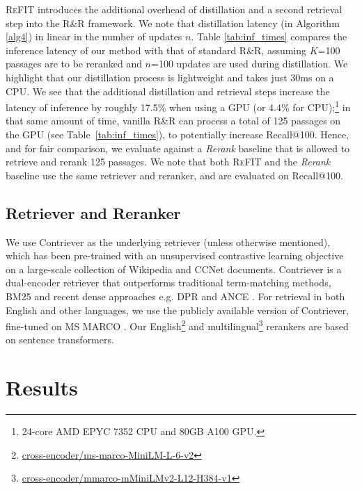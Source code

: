 \textsc{ReFIT} introduces the additional overhead of distillation and a second retrieval step into the R\&R framework. We note that distillation latency (in Algorithm \ref{alg4}) in linear in the number of updates $n$.
Table \ref{tab:inf_times} compares the inference latency of our method with that of standard R\&R, assuming $K$=100 passages are to be reranked and $n$=100 updates are used during distillation. We highlight that our distillation process is lightweight and takes just 30ms on a CPU. We see that the additional distillation and retrieval steps increase the latency of inference by roughly 17.5\% when using a GPU (or 4.4\% for CPU);\footnote{24-core AMD EPYC 7352 CPU and 80GB A100 GPU.} in that same amount of time, vanilla R\&R can process a total of 125 passages on the GPU (see Table~\ref{tab:inf_times}), to potentially increase Recall@100. Hence, and for fair comparison, we evaluate against a \mbox{\textit{Rerank}} baseline that is allowed to retrieve and rerank 125 passages. 
We note that both \textsc{ReFIT} and the \textit{Rerank} baseline use the same retriever and reranker, and are evaluated on Recall@100. 

\subsection{Retriever and Reranker} 
\label{sec:retriever_and_reranker}
We use Contriever \cite{izacard2021unsupervised} as the underlying retriever (unless otherwise mentioned), which has been pre-trained with an unsupervised contrastive learning objective on a large-scale collection of Wikipedia and CCNet documents. Contriever is a dual-encoder retriever that outperforms  traditional term-matching methods, BM25 and recent dense approaches e.g. DPR \cite{karpukhin2020dense} and ANCE \cite{xiong2020approximate}.
For retrieval in both English and other languages, we use the publicly available version of Contriever, fine-tuned on MS MARCO \cite{nguyen2016ms}. Our English\footnote{\href{https://huggingface.co/cross-encoder/ms-marco-MiniLM-L-6-v2}{cross-encoder/ms-marco-MiniLM-L-6-v2}} and multilingual\footnote{\href{https://huggingface.co/cross-encoder/mmarco-mMiniLMv2-L12-H384-v1}{cross-encoder/mmarco-mMiniLMv2-L12-H384-v1}} rerankers are based on sentence transformers. 

\section{Results}
\label{sec:results}


